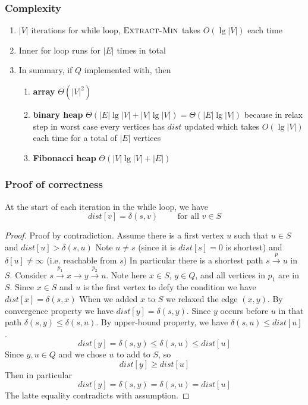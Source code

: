 \documentclass[11pt]{article}
\begin{document}
\subsubsection*{Complexity}
\begin{enumerate}
  \item $|V|$ iterations for while loop, $\textsc{Extract-Min}$ takes $O(\lg |V|)$ each time
  \item Inner for loop runs for $|E|$ times in total
  \item In summary, if $Q$ implemented with, then
  \begin{enumerate}
    \item \textbf{array} $\Theta(|V|^2)$
    \item \textbf{binary heap} $\Theta(|E|\lg |V| + |V|\lg |V|) = \Theta(|E|\lg |V|)$ because in relax step in worst case every vertices has $dist$ updated which takes $O(\lg |V|)$ each time for a total of $|E|$ vertices
    \item \textbf{Fibonacci heap} $\Theta(|V| \lg |V| + |E|)$
  \end{enumerate}
\end{enumerate}

\subsubsection*{Proof of correctness}

\begin{proposition*}
  At the start of each iteration in the while loop, we have
  \[
    dist[v] = \delta(s, v) \quad \quad \text{ for all } v\in S
  \]
  \begin{proof}
    Proof by contradiction. Assume there is a first vertex $u$ such that $u\in S$ and $dist[u] > \delta(s, u)$ Note $u\neq s$ (since it is $dist[s] = 0$ is shortest) and $\delta[u] \neq \infty$ (i.e. reachable from $s$) In particular there is a shortest path $s\overset{p}{\to} u$ in $S$. Consider $s\overset{p_1}{\to} x \to y\overset{p_2}{\to} u$. Note here $x\in S$, $y\in Q$, and all vertices in $p_1$ are in $S$. Since $x\in S$ and $u$ is the first vertex to defy the condition we have $dist[x] = \delta(s, x)$ When we added $x$ to $S$ we relaxed the edge $(x,y)$. By convergence property we have $dist[y] = \delta(s,y)$. Since $y$ occurs before $u$ in that path $\delta(s, y) \leq \delta(s,u)$. By upper-bound property, we have $\delta(s,u)\leq dist[u]$.
    \[
      dist[y] = \delta(s, y) \leq \delta(s,u) \leq dist[u]
    \]
    Since $y,u\in Q$ and we chose $u$ to add to $S$, so
    \[
      dist[y] \geq dist[u]
    \]
    Then in particular
    \[
      dist[y] = \delta(s,y) = \delta(s, u) = dist[u]
    \]
    The latte equality contradicts with assumption.
  \end{proof}
\end{proposition*}
\end{document}
